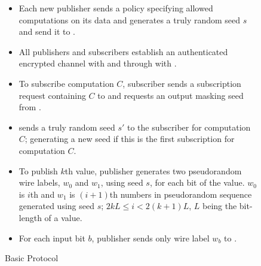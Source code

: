 \begin{figure}[h]
	\caption{Basic Protocol}
\label{fig:basicprotocol}
\begin{mdframed}[style=myframe]


\initialize
\begin{itemize}[leftmargin=*]
 
	\item Each new publisher sends \broker a policy specifying allowed
		computations on its data and generates a truly random seed $s$ and send
		it to \garbler.

	\item All publishers and subscribers establish an authenticated encrypted
		channel with \broker and through \broker with \garbler.

\end{itemize}

\subscribe
\begin{itemize}[leftmargin=*]

	\item To subscribe computation $C$, subscriber sends a subscription request
	  containing $C$ to \broker and requests an output masking seed from
	  \garbler.

	\item \garbler sends a truly random seed $s'$ to the subscriber for
		computation $C$; generating a new seed if this is the first subscription
		for computation $C$.

\end{itemize}

\publish
\begin{itemize}[leftmargin=*]
		
	\item To publish $k$th value, publisher generates two pseudorandom wire
		labels, $w_0$ and $w_1$, using seed $s$, for each bit of the value.  $w_0$
		is $i$th and $w_1$ is $(i+1)$th numbers in pseudorandom sequence generated
		using seed $s$; $2kL \leq i < 2(k+1)L$, $L$ being the bit-length of a
		value.

	\item For each input bit $b$, publisher sends only wire label $w_b$ to
		\broker.

\end{itemize}

\compute
\begin{itemize}[leftmargin=*]


\end{itemize}
\end{mdframed}
\end{figure}
